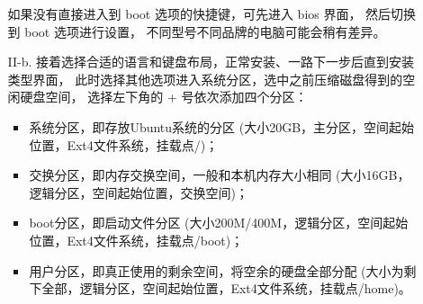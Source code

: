\begin{itemize}
\begin{itemize}
				如果没有直接进入到 boot 选项的快捷键，可先进入 bios 界面，
				然后切换到 boot 选项进行设置，
				不同型号不同品牌的电脑可能会稍有差异。
			\item [II-b.] 接着选择合适的语言和键盘布局，正常安装、一路下一步后直到安装类型界面，
				此时选择其他选项进入系统分区，选中之前压缩磁盘得到的空闲硬盘空间，
				选择左下角的 + 号依次添加四个分区：
				\begin{itemize}
					\item 系统分区，即存放Ubuntu系统的分区
					(大小20GB，主分区，空间起始位置，Ext4文件系统，挂载点/)；
					\item 交换分区，即内存交换空间，一般和本机内存大小相同
					(大小16GB，逻辑分区，空间起始位置，交换空间)；
					\item boot分区，即启动文件分区
					(大小200M/400M，逻辑分区，空间起始位置，Ext4文件系统，挂载点/boot)；
					\item 用户分区，即真正使用的剩余空间，将空余的硬盘全部分配
					(大小为剩下全部，逻辑分区，空间起始位置，Ext4文件系统，挂载点/home)。
				\end{itemize}
				\begin{figure}[htbp]
					\centering
					\hfill
					\label{fig:installType}
　　				\end{figure}
				\begin{figure}[htbp]
					\centering
\end{figure}
\end{itemize}
\end{itemize}

